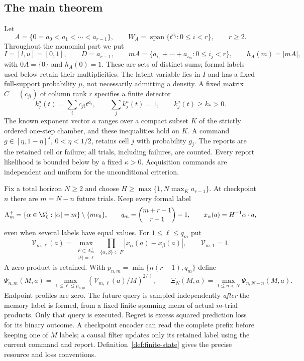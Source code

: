 \subsection{The main theorem}
Let
\[
 A=\{0=a_0<a_1<\cdots<a_{r-1}\},\qquad
 W_A=\operatorname{span}\{t^{a_i}:0\le i<r\},\qquad r\ge2.
\]
Throughout the monomial part we put
\[
 I=[l,u]=[0,1],\qquad D=a_{r-1},\qquad
 mA=\{a_{i_1}+\cdots+a_{i_m}:0\le i_j<r\},\qquad h_A(m)=|mA|,
\]
with $0A=\{0\}$ and $h_A(0)=1$. These are sets of distinct sums;
formal labels used below retain their multiplicities.
The latent variable lies in $I$ and has a fixed full-support
probability $\mu$, not necessarily admitting a density. A fixed matrix
$C=(c_{ji})$ of column rank $r$ specifies a finite detector
\[
 k_j^a(t)=\sum_i c_{ji}t^{a_i},\qquad
 \sum_j k_j^a(t)=1,\qquad k_j^a(t)\ge k_*>0.
\]
The known exponent vector $a$ ranges over a compact subset $K$ of the
strictly ordered one-step chamber, and these inequalities hold on $K$.
A command $g\in[\eta,1-\eta]^J$, $0<\eta<1/2$, retains cell $j$
with probability $g_j$. The reports are the retained cell or failure;
all trials, including failures, are counted. Every report likelihood is
bounded below by a fixed $\kappa>0$. Acquisition commands are independent
and uniform for the unconditional criterion.

Fix a total horizon $N\ge2$ and choose
$H\ge\max\{1,N\max_K a_{r-1}\}$. At checkpoint $n$ there are
$m=N-n$ future trials. Keep every formal label
\[
 \Lambda_m^+=\{\alpha\in\N_0^r:|\alpha|=m\}\setminus\{me_0\},
 \qquad q_m=\binom{m+r-1}{r-1}-1,
 \qquad x_\alpha(a)=H^{-1}\alpha\cdot a,
\]
even when several labels have equal values. For $1\le\ell\le q_m$ put
\[
 \mathcal V_{m,\ell}(a)=\max_{\substack{F\subset\Lambda_m^+\\|F|=\ell}}
     \prod_{\{\alpha,\beta\}\subset F}|x_\alpha(a)-x_\beta(a)|,
 \qquad \mathcal V_{m,1}=1.
\]
A zero product is retained. With $p_{n,m}=\min\{n(r-1),q_m\}$ define
\[
 \Psi_{n,m}(M,a)=\max_{1\le\ell\le p_{n,m}}
       (\mathcal V_{m,\ell}(a)/M)^{2/\ell},\qquad
 \Xi_N(M,a)=\max_{1\le n<N}\Psi_{n,N-n}(M,a).
\]
Endpoint profiles are zero. The future query is sampled independently
\emph{after} the memory label is formed, from a fixed finite spanning
menu of actual $m$-trial products. Only that query is executed. Regret
is excess squared prediction loss for its binary outcome. A checkpoint
encoder can read the complete prefix before keeping one of $M$ labels;
a causal filter updates only its retained label using the current
command and report. Definition~\ref{def:finite-state} gives the precise
resource and loss conventions.

